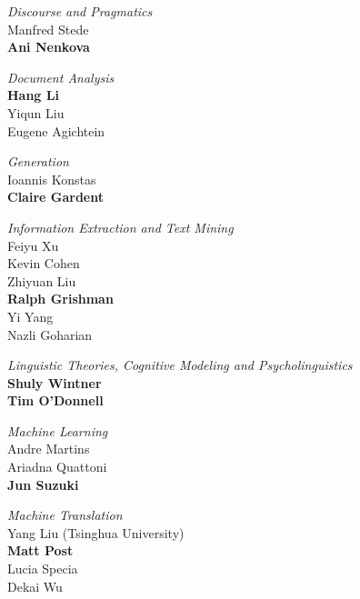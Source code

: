\emph{Discourse and Pragmatics} \\
\hspace*{5mm}Manfred Stede \\
\hspace*{5mm}\textbf{Ani Nenkova}

\emph{Document Analysis} \\
\hspace*{5mm}\textbf{Hang Li} \\
\hspace*{5mm}Yiqun Liu \\
\hspace*{5mm}Eugene Agichtein

\emph{Generation} \\
\hspace*{5mm}Ioannis Konstas \\
\hspace*{5mm}\textbf{Claire Gardent}

\emph{Information Extraction and Text Mining} \\
\hspace*{5mm}Feiyu Xu \\
\hspace*{5mm}Kevin Cohen \\
\hspace*{5mm}Zhiyuan Liu \\
\hspace*{5mm}\textbf{Ralph Grishman} \\
\hspace*{5mm}Yi Yang \\
\hspace*{5mm}Nazli Goharian

\emph{Linguistic Theories, Cognitive Modeling and Psycholinguistics}\\
\hspace*{5mm}\textbf{Shuly Wintner} \\
\hspace*{5mm}\textbf{Tim O'Donnell}

\emph{Machine Learning} \\
\hspace*{5mm}Andre Martins \\
\hspace*{5mm}Ariadna Quattoni \\
\hspace*{5mm}\textbf{Jun Suzuki}

\emph{Machine Translation} \\
\hspace*{5mm}Yang Liu (Tsinghua University)\\
\hspace*{5mm}\textbf{Matt Post} \\
\hspace*{5mm}Lucia Specia \\
\hspace*{5mm}Dekai Wu

